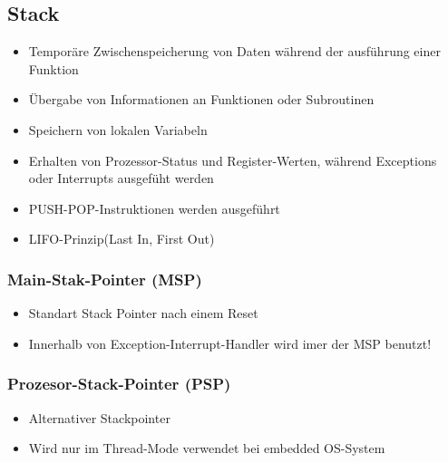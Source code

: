 \subsection{Stack}
\begin{multicols}{2}
    \begin{minipage}{0.5\textwidth}
        \begin{itemize}
            \item Temporäre Zwischenspeicherung von Daten während der ausführung einer Funktion
            \item Übergabe von Informationen an Funktionen oder Subroutinen
            \item Speichern von lokalen Variabeln
            \item Erhalten von Prozessor-Status und Register-Werten, während Exceptions oder Interrupts ausgefüht werden
            \item PUSH-POP-Instruktionen werden ausgeführt
            \item LIFO-Prinzip(Last In, First Out)
        \end{itemize}
    \end{minipage}
    
    \begin{minipage}{0.5\textwidth}
        \subsubsection{Main-Stak-Pointer (MSP)}
        \begin{itemize}
            \item Standart Stack Pointer nach einem Reset
            \item Innerhalb von Exception-Interrupt-Handler wird imer der MSP benutzt!
            \end{itemize}
        \subsubsection{Prozesor-Stack-Pointer (PSP)}
        \begin{itemize}
            \item Alternativer Stackpointer
            \item Wird nur im Thread-Mode verwendet
            \subitem \rightarrow bei embedded OS-System
        \end{itemize}   
    \end{minipage}
\end{multicols}


















